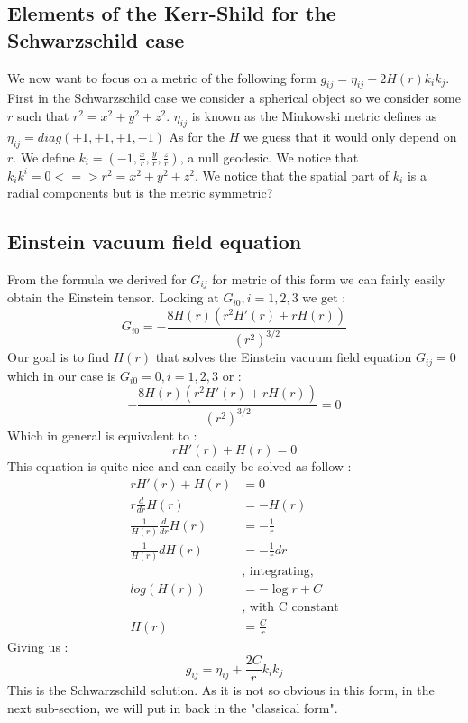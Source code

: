 \documentclass[a4paper,12pt]{article}
\theoremstyle{definition}
\begin{document}
\subsection{Elements of the Kerr-Shild for the Schwarzschild case}
We now want to focus on a metric of the following form $g_{ij}=\eta_{ij}+2H(r)k_ik_j$.
First in the Schwarzschild case we consider a spherical object so we consider some $r$ such that $r^2=x^2+y^2+z^2$.
$\eta_{ij}$ is known as the Minkowski metric defines as $\eta_{ij}=diag(+1,+1,+1,-1)$
As for the $H$ we guess that it would only depend on $r$.
We define $k_i=(-1,\frac{x}{r},\frac{y}{r},\frac{z}{r})$, a null geodesic.
We notice that $k_ik^i=0 <=> r^2=x^2+y^2+z^2$.
We notice that the spatial part of $k_i$ is a radial components but is the metric symmetric?
\subsection{Einstein vacuum field equation}
From the formula we derived for $G_{ij}$ for metric of this form we can fairly easily obtain the Einstein tensor.
Looking at $G_{i0}, i=1,2,3$ we get :
\begin{equation}
	G_{i0}=-\frac{8 H(r) (r^2 H'(r)+rH(r))}{(r^2)^{3/2}}
\end{equation}
Our goal is to find $H(r)$ that solves the Einstein vacuum field equation $G_{ij}=0$ which in our case is $G_{i0}=0, i=1,2,3$ or :
\begin{equation}
	-\frac{8 H(r) (r^2 H'(r)+rH(r))}{(r^2)^{3/2}}=0
\end{equation}
Which in general is equivalent to :
\begin{equation}
	rH'(r)+H(r)=0
\end{equation}
This equation is quite nice and can easily be solved as follow :
\begin{align*}
	rH'(r)+H(r)&=0\\
	r\frac{d}{dr}H(r)&=-H(r)\\
	\frac{1}{H(r)}\frac{d}{dr}H(r)&=-\frac{1}{r}\\
	\frac{1}{H(r)}dH(r)&=-\frac{1}{r}dr \;\\
	&\text{, integrating,}\\
	log(H(r))&=-\log{r}+C \;\\
	&\text{, with C constant}\\
	H(r)&=\frac{C}{r}
\end{align*}
Giving us :
\begin{equation}
	g_{ij}=\eta_{ij}+\frac{2C}{r}k_ik_j
\end{equation}
This is the Schwarzschild solution. As it is not so obvious in this form, in the next sub-section, we will put in back in the "classical form".
\end{document}
